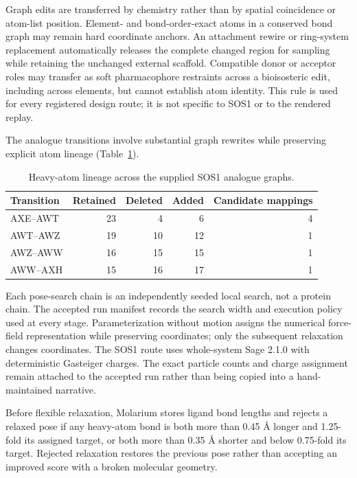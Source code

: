 \documentclass[11pt]{article}
\begin{document}
\begin{small}
Graph edits are transferred by chemistry rather than by spatial coincidence or atom-list position. Element- and bond-order-exact atoms in a conserved bond graph may remain hard coordinate anchors. An attachment rewire or ring-system replacement automatically releases the complete changed region for sampling while retaining the unchanged external scaffold. Compatible donor or acceptor roles may transfer as soft pharmacophore restraints across a bioisosteric edit, including across elements, but cannot establish atom identity. This rule is used for every registered design route; it is not specific to SOS1 or to the rendered replay.

The analogue transitions involve substantial graph rewrites while preserving explicit atom lineage (Table~\ref{tab:appA_lineage}).

\begin{table}[htbp]
\centering\small
\caption{Heavy-atom lineage across the supplied SOS1 analogue graphs.}
\label{tab:appA_lineage}
\begin{tabular}{@{}lrrrr@{}}
\toprule
\textbf{Transition} & \textbf{Retained} & \textbf{Deleted} & \textbf{Added} & \textbf{Candidate mappings}\\
\midrule
AXE--AWT & 23 & 4 & 6 & 4\\
AWT--AWZ & 19 & 10 & 12 & 1\\
AWZ--AWW & 16 & 15 & 15 & 1\\
AWW--AXH & 15 & 16 & 17 & 1\\
\bottomrule
\end{tabular}
\end{table}

Each pose-search chain is an independently seeded local search, not a protein chain. The accepted run manifest records the search width and execution policy used at every stage. Parameterization without motion assigns the numerical force-field representation while preserving coordinates; only the subsequent relaxation changes coordinates. The SOS1 route uses whole-system Sage 2.1.0 with deterministic Gasteiger charges. The exact particle counts and charge assignment remain attached to the accepted run rather than being copied into a hand-maintained narrative.

Before flexible relaxation, Molarium stores ligand bond lengths and rejects a relaxed pose if any heavy-atom bond is both more than 0.45 \AA{} longer and 1.25-fold its assigned target, or both more than 0.35 \AA{} shorter and below 0.75-fold its target. Rejected relaxation restores the previous pose rather than accepting an improved score with a broken molecular geometry.


\end{small}
\end{document}
